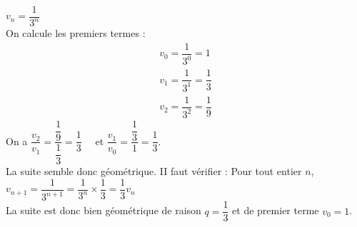 \documentclass[a4paper,french]{book}
\begin{document}
\begin{enumMet}
    \item $v_{n}=\dfrac{1}{3^{n}}$\\
    On calcule les premiers termes :
    $$
    \begin{array}{l}
    v_{0}=\dfrac{1}{3^{0}}=1 \\
    v_{1}=\dfrac{1}{3^{1}}=\dfrac{1}{3} \\
    v_{2}=\dfrac{1}{3^{2}}=\dfrac{1}{9}
    \end{array}
    $$
    On a $\dfrac{v_{2}}{v_{1}}=\dfrac{\dfrac{1}{9}}{\dfrac{1}{3}}=\dfrac{1}{3} \quad$ et $\dfrac{v_{1}}{v_{0}}=\dfrac{\dfrac{1}{3}}{1}=\dfrac{1}{3}$.\\
    La suite semble donc géométrique. II faut vérifier : Pour tout entier $n$,\\
    $v_{n+1}=\dfrac{1}{3^{n+1}}=\dfrac{1}{3^{n}} \times \dfrac{1}{3}=\dfrac{1}{3} v_{n}$\\
    La suite est donc bien géométrique de raison $q=\dfrac{1}{3}$ et de premier terme $v_{0}=1$.
\end{enumMet}
\end{document}
